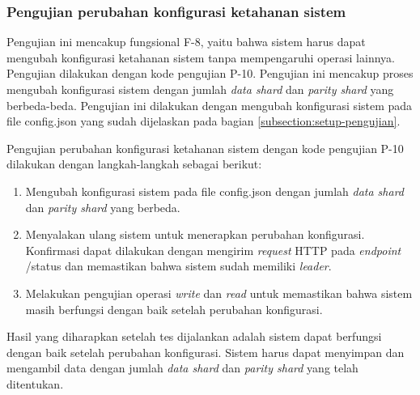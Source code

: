 \subsubsection{Pengujian perubahan konfigurasi ketahanan sistem}
\label{subsubsection:pengujian-perubahan-konfigurasi-ketahanan}

Pengujian ini mencakup fungsional F-8, yaitu bahwa sistem harus dapat mengubah konfigurasi ketahanan sistem tanpa mempengaruhi operasi lainnya. Pengujian dilakukan dengan kode pengujian P-10. Pengujian ini mencakup proses mengubah konfigurasi sistem dengan jumlah \textit{data shard} dan \textit{parity shard} yang berbeda-beda. Pengujian ini dilakukan dengan mengubah konfigurasi sistem pada file config.json yang sudah dijelaskan pada bagian \ref{subsection:setup-pengujian}.

Pengujian perubahan konfigurasi ketahanan sistem dengan kode pengujian P-10 dilakukan dengan langkah-langkah sebagai berikut:
\begin{enumerate}
  \item Mengubah konfigurasi sistem pada file config.json dengan jumlah \textit{data shard} dan \textit{parity shard} yang berbeda.
  \item Menyalakan ulang sistem untuk menerapkan perubahan konfigurasi. Konfirmasi dapat dilakukan dengan mengirim \textit{request} HTTP pada \textit{endpoint} /status dan memastikan bahwa sistem sudah memiliki \textit{leader}.
  \item Melakukan pengujian operasi \textit{write} dan \textit{read} untuk memastikan bahwa sistem masih berfungsi dengan baik setelah perubahan konfigurasi.
\end{enumerate}

Hasil yang diharapkan setelah tes dijalankan adalah sistem dapat berfungsi dengan baik setelah perubahan konfigurasi. Sistem harus dapat menyimpan dan mengambil data dengan jumlah \textit{data shard} dan \textit{parity shard} yang telah ditentukan.
